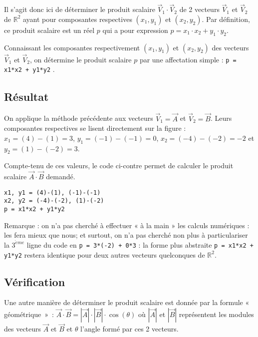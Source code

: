 Il s'agit donc ici de déterminer le produit scalaire $\vec{V}_1\cdot\vec{V}_2$ 
de 2 vecteurs $\vec{V}_1$ et $\vec{V}_2$ de $\mathbb{R}^2$
ayant pour composantes respectives $(x_1,y_1)$ et $(x_2,y_2)$. 
Par définition, ce produit scalaire est un réel $p$ qui a pour expression 
$p = x_1\cdot x_2 + y_1\cdot y_2$.

Connaissant les composantes respectivement $(x_1,y_1)$ et $(x_2,y_2)$ des 
vecteurs $\vec{V}_1$ et $\vec{V}_2$, 
on détermine le produit scalaire $p$ par une affectation simple : 
\texttt{p = x1*x2 + y1*y2} .

\subsection{Résultat}\label{affectation:maths:resultat}
On applique la méthode précédente aux vecteurs $\vec{V}_1 = \vec{A}$
et $\vec{V}_2 = \vec{B}$. Leurs composantes respectives se lisent directement 
sur la figure : 
$x_1 = (4) - (1) = 3$, $y_1 = (-1) - (-1) = 0$, 
$x_2 = (-4) - (-2) = -2$ et $y_2 = (1) - (-2) = 3$.

\noindent\begin{minipage}{7cm}
Compte-tenu de ces valeurs, le code ci-contre
permet de calculer le produit scalaire $\vec{A}\cdot\vec{B}$
demandé.
\end{minipage}
\hfill
\begin{minipage}{8cm}
\begin{lstlisting}[caption=\textbf{produit scalaire}]
x1, y1 = (4)-(1), (-1)-(-1)
x2, y2 = (-4)-(-2), (1)-(-2)
p = x1*x2 + y1*y2
\end{lstlisting}
\end{minipage}

Remarque : on n'a pas cherché à effectuer « à la main » les calculs numériques :
\python{} les fera mieux que nous; et surtout, on n'a pas cherché non plus à 
particulariser la $3^{\grave eme}$ ligne du code en \texttt{p = 3*(-2) + 0*3} :
la forme plus abstraite \texttt{p = x1*x2 + y1*y2} restera identique pour 
deux autres vecteurs quelconques de $\mathbb{R}^2$. 

\subsection{Vérification}\label{affectation:maths:verification}
Une autre manière de déterminer le produit scalaire est donnée par la formule
« géométrique~»~: $\vec{A}\cdot\vec{B} = |\vec{A}| \cdot |\vec{B}| \cdot \cos(\theta)$ où
$|\vec{A}|$ et $|\vec{B}|$ représentent les modules des vecteurs 
$\vec{A}$ et $\vec{B}$ et $\theta$ l'angle formé par ces 2 vecteurs.
\vspace*{2mm}

